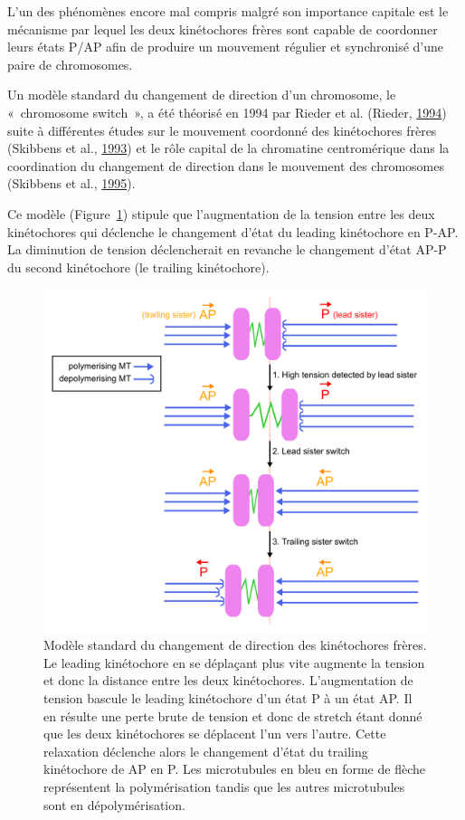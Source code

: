 \documentclass[12pt,a4paper,twoside,openright]{book}
\begin{document}
L'un des phénomènes encore mal compris malgré son importance capitale
est le mécanisme par lequel les deux kinétochores frères sont capable de
coordonner leurs états P/AP afin de produire un mouvement régulier et
synchronisé d'une paire de chromosomes.

Un modèle standard du changement de direction d'un chromosome, le
«~chromosome switch~», a été théorisé en 1994 par Rieder et al. (Rieder,
\protect\hyperlink{ref-Rieder1994}{1994}) suite à différentes études sur
le mouvement coordonné des kinétochores frères (Skibbens et al.,
\protect\hyperlink{ref-Skibbens1993}{1993}) et le rôle capital de la
chromatine centromérique dans la coordination du changement de direction
dans le mouvement des chromosomes (Skibbens et al.,
\protect\hyperlink{ref-Skibbens1995}{1995}).

Ce modèle (Figure~\ref{fig:run-switch}) stipule que l'augmentation de la
tension entre les deux kinétochores qui déclenche le changement d'état
du leading kinétochore en P-AP. La diminution de tension déclencherait
en revanche le changement d'état AP-P du second kinétochore (le trailing
kinétochore).

\begin{figure}[htbp]
\centering
\includegraphics{figures/intro/run_switch.png}
\caption[Modèle standard du changement de direction des kinétochores frères.]{\label{fig:run-switch}Modèle
standard du changement de direction des kinétochores frères. Le leading
kinétochore en se déplaçant plus vite augmente la tension et donc la
distance entre les deux kinétochores. L'augmentation de tension bascule
le leading kinétochore d'un état P à un état AP. Il en résulte une perte
brute de tension et donc de stretch étant donné que les deux
kinétochores se déplacent l'un vers l'autre. Cette relaxation déclenche
alors le changement d'état du trailing kinétochore de AP en P. Les
microtubules en bleu en forme de flèche représentent la polymérisation
tandis que les autres microtubules sont en dépolymérisation.}
\end{figure}
\end{document}
